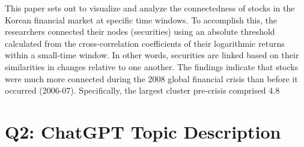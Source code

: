 \documentclass[12pt]{article}
\begin{document}
This paper sets out to visualize and analyze the connectedness of stocks in the Korean financial market at specific time windows. To accomplish this, the researchers connected their nodes (securities) using an absolute threshold calculated from the cross-correlation coefficients of their logarithmic returns within a small-time window. In other words, securities are linked based on their similarities in changes relative to one another. The findings indicate that stocks were much more connected during the 2008 global financial crisis than before it occurred (2006-07). Specifically, the largest cluster pre-crisis comprised 4.8%

\section{Q2: ChatGPT Topic Description}


\end{document}
